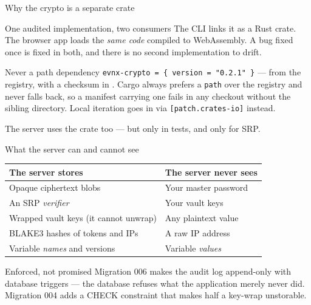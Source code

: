 \documentclass[aspectratio=169,10pt]{beamer}
\begin{document}
\begin{frame}{Why the crypto is a separate crate}
  \begin{block}{One audited implementation, two consumers}
    The CLI links it as a Rust crate. The browser app loads the \emph{same code}
    compiled to WebAssembly. A bug fixed once is fixed in both, and there is no
    second implementation to drift.
  \end{block}

  \vspace{0.6em}
  \begin{alertblock}{Never a path dependency}
    \texttt{evnx-crypto = \{ version = "0.2.1" \}} --- from the registry, with a
    checksum in . Cargo always prefers a \texttt{path} over the
    registry and never falls back, so a manifest carrying one fails in any
    checkout without the sibling directory. Local iteration goes in
     via \texttt{[patch.crates-io]} instead.
  \end{alertblock}

  \vspace{0.4em}
  {\footnotesize The server uses the crate too --- but only in tests, and only
  for SRP.}
\end{frame}

\begin{frame}{What the server can and cannot see}
  \begin{center}
  \begin{tabular}{@{}ll@{}}
    \toprule
    \textbf{The server stores} & \textbf{The server never sees} \\
    \midrule
    Opaque ciphertext blobs & Your master password \\
    An SRP \emph{verifier} & Your vault keys \\
    Wrapped vault keys (it cannot unwrap) & Any plaintext value \\
    BLAKE3 hashes of tokens and IPs & A raw IP address \\
    Variable \emph{names} and versions & Variable \emph{values} \\
    \bottomrule
  \end{tabular}
  \end{center}

  \vspace{0.8em}
  \begin{block}{Enforced, not promised}
    Migration 006 makes the audit log append-only with database triggers ---
    the database refuses what the application merely never did. Migration 004
    adds a CHECK constraint that makes half a key-wrap unstorable.
  \end{block}
\end{frame}
\end{document}
